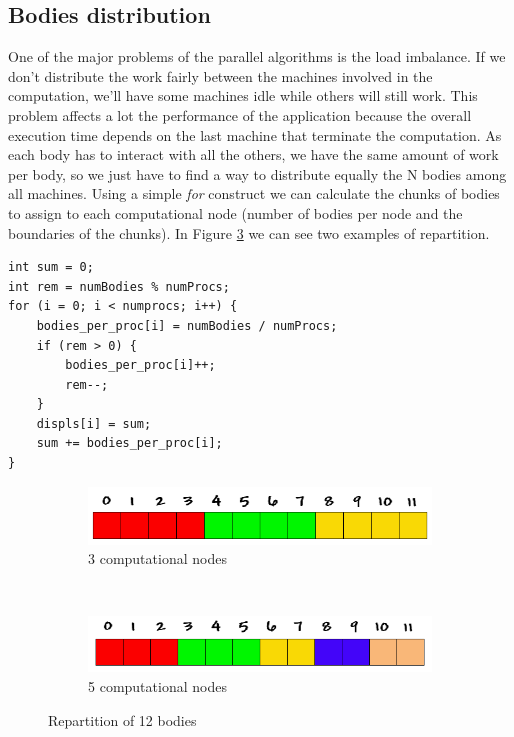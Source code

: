 \documentclass[a4paper]{article}
\begin{document}
\subsection{Bodies distribution}
\label{sec:bodies_distr}
One of the major problems of the parallel algorithms is the load imbalance. If we don't distribute the work fairly between the machines involved in the computation, we'll have some machines idle while others will still work. This problem affects a lot the performance of the application because the overall execution time depends on the last machine that terminate the computation. As each body has to interact with all the others, we have the same amount of work per body, so we just have to find a way to distribute equally the N bodies among all machines. Using a simple \textit{for} construct we can calculate the chunks of bodies to assign to each computational node (number of bodies per node and the boundaries of the chunks). In Figure \ref{fig:repa} we can see two examples of repartition.

\begin{lstlisting}
int sum = 0;
int rem = numBodies % numProcs; 
for (i = 0; i < numprocs; i++) {
    bodies_per_proc[i] = numBodies / numProcs;
    if (rem > 0) {
        bodies_per_proc[i]++;
        rem--;
    }
    displs[i] = sum;
    sum += bodies_per_proc[i];
}
\end{lstlisting}
\FloatBarrier

\begin{figure}[t!]
    \centering
    \begin{subfigure}[b]{0.5\textwidth}
        \centering
        \includegraphics[width=1\linewidth]{array_procs_3}
        \caption{3 computational nodes}
        \label{fig:repa1}
    \end{subfigure}%
    ~ 
    \begin{subfigure}[b]{0.5\textwidth}
        \centering
        \includegraphics[width=1\linewidth]{array_procs_5}
        \caption{5 computational nodes}
        \label{fig:repa2}
    \end{subfigure}
    \caption{Repartition of 12 bodies}
    \label{fig:repa}
    	
\end{figure}
\FloatBarrier
\end{document}
